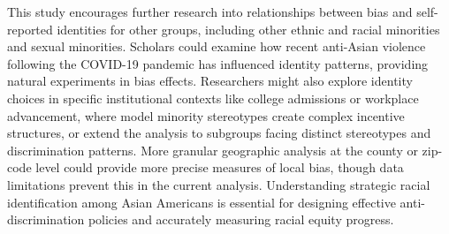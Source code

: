 This study encourages further research into relationships between bias and self-reported identities for other groups, including other ethnic and racial minorities and sexual minorities. Scholars could examine how recent anti-Asian violence following the COVID-19 pandemic has influenced identity patterns, providing natural experiments in bias effects. Researchers might also explore identity choices in specific institutional contexts like college admissions or workplace advancement, where model minority stereotypes create complex incentive structures, or extend the analysis to subgroups facing distinct stereotypes and discrimination patterns. More granular geographic analysis at the county or zip-code level could provide more precise measures of local bias, though data limitations prevent this in the current analysis. Understanding strategic racial identification among Asian Americans is essential for designing effective anti-discrimination policies and accurately measuring racial equity progress.

